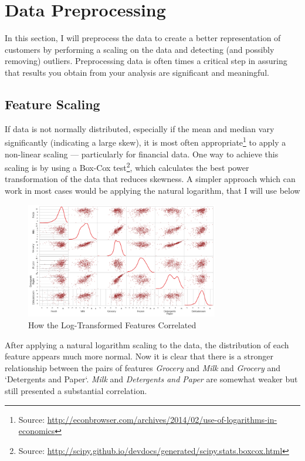 \documentclass[a4paper]{article}
\begin{document}
\section{Data Preprocessing}
\label{sec:data_preprocessing}
In this section, I will preprocess the data to create a better representation of customers by performing a scaling on the data and detecting (and possibly removing) outliers. Preprocessing data is often times a critical step in assuring that results you obtain from your analysis are significant and meaningful.


\subsection{Feature Scaling}
If data is not normally distributed, especially if the mean and median vary significantly (indicating a large skew), it is most often appropriate\footnote{Source: \url{http://econbrowser.com/archives/2014/02/use-of-logarithms-in-economics}} to apply a non-linear scaling — particularly for financial data. One way to achieve this scaling is by using a Box-Cox test\footnote{Source: \url{http://scipy.github.io/devdocs/generated/scipy.stats.boxcox.html}}, which calculates the best power transformation of the data that reduces skewness. A simpler approach which can work in most cases would be applying the natural logarithm, that I will use below

\begin{figure}[ht!]
\centering
\includegraphics[width=0.75\textwidth]{figures/scatter_matrix_log.png}
\caption{\label{fig:log_scatter_matrix}How the Log-Transformed Features Correlated}
\end{figure}

After applying a natural logarithm scaling to the data, the distribution of each feature appears much more normal. Now it is clear that there is a stronger relationship between the pairs of features \textit{Grocery} and \textit{Milk} and \textit{Grocery} and `Detergents and Paper`. \textit{Milk} and \textit{Detergents and Paper} are somewhat weaker but still presented a substantial correlation.
\end{document}
